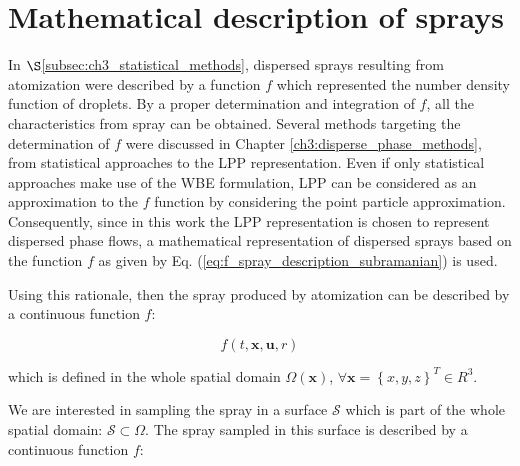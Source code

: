 
\section{Mathematical description of sprays}
	\label{sec:ch4_spray_description}

In $\S$\ref{subsec:ch3_statistical_methods}, dispersed sprays resulting from atomization were described by a function $f$ which represented the number density function of droplets. By a proper determination and integration of $f$, all the characteristics from spray can be obtained. Several methods targeting the determination of $f$ were discussed in Chapter \ref{ch3:disperse_phase_methods}, from statistical approaches to the LPP representation. Even if only statistical approaches make use of the WBE formulation, LPP can be considered as an approximation to the $f$ function by considering the point particle approximation. Consequently, since in this work the LPP representation is chosen to represent dispersed phase flows, a mathematical representation of dispersed sprays based on the function $f$ as given by Eq. (\ref{eq:f_spray_description_subramanian}) is used.


Using this rationale, then the spray produced by atomization can be described by a continuous function $f$:

\begin{equation}
f \left( t, \textbf{x}, \textbf{u}, r \right) 
\end{equation}

which is defined in the whole spatial domain $\Omega \left( \boldsymbol{x} \right)$, $\forall \boldsymbol{x} = \left\lbrace x, y, z \right\rbrace^T \in {R}^3$. 


We are interested in sampling the spray in a surface $\mathcal{S}$ which is part of the whole spatial domain: $\mathcal{S} \subset \Omega $. The spray sampled in this surface is described by a continuous function $f$:

